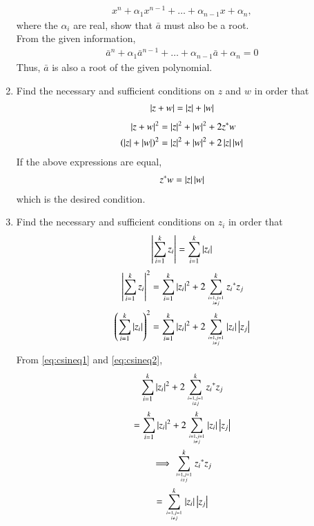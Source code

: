 \begin{enumerate}[label=\arabic*.,ref=\thesubsection.\theenumi]
		\begin{align}
			x^{n} +\alpha_1x^{n-1} + \dots + \alpha_{n-1}x + \alpha_n,
		\end{align}
		where the $\alpha_i$ are real, show that $\bar{a}$ must also be a root.
		\\
		\solution From the given information, 
		\begin{align}
			\bar{a}^{n} +\alpha_1\bar{a}^{n-1} + \dots + \alpha_{n-1}\bar{a} + \alpha_n = 0
		\end{align}
		Thus, $\bar{a}$ is also a root of the given polynomial.
	\item Find the necessary and sufficient conditions on $z$ and $w$ in order that
		\begin{align}
			\left\vert z+w\right\vert = \left\vert z\right\vert + \left\vert w\right\vert
		\end{align}
		\solution 
		\begin{align}
			\left\vert z+w\right\vert^2 
			&= \left\vert z\right\vert^2 + \left\vert w\right\vert^2 +2z^{*}w
			\\
			\left(\left\vert z\right\vert + \left\vert w\right\vert\right)^2 &= \left\vert z\right\vert^2 + \left\vert w\right\vert^2 +2\left\vert z\right\vert\left\vert w\right\vert
		\end{align}
		If the above expressions are equal, 
		\begin{align}
z^{*}w = \left\vert z\right\vert\left\vert w\right\vert
		\end{align}
		which is the desired condition.
	\item Find the necessary and sufficient conditions on $z_i$  in order that
		\begin{align}
			\left\vert\sum_{i=1}^{k}z_i\right\vert = \sum_{i=1}^{k}\left\vert z_i\right\vert
		\end{align}
		\solution 
		\begin{align}
			\label{eq:csineq1}
			\left\vert\sum_{i=1}^{k}z_i\right\vert^2 &= \sum_{i=1}^{k}\left\vert z_i\right\vert^2 + 2\sum_{i=1,j=1 \atop i \ne j }^{k}{z_i}^* z_j
			\\
			\left(\sum_{i=1}^{k}\left\vert z_i\right\vert\right)^2 &= \sum_{i=1}^{k}\left\vert z_i\right\vert^2 + 2\sum_{i=1,j=1 \atop i \ne j }^{k}\left\vert{z_i}\right\vert\left\vert z_j\right\vert
			\label{eq:csineq2}
		\end{align}
			From \eqref{eq:csineq1} and 
			\eqref{eq:csineq2},
\begin{multline}
			\sum_{i=1}^{k}\left\vert z_i\right\vert^2 + 2\sum_{i=1,j=1 \atop i \ne j }^{k}{z_i}^* z_j
			\\
			=
\sum_{i=1}^{k}\left\vert z_i\right\vert^2 + 2\sum_{i=1,j=1 \atop i \ne j }^{k}\left\vert{z_i}\right\vert\left\vert z_j\right\vert
\\
\implies 
\sum_{i=1,j=1 \atop i \ne j }^{k}{z_i}^* z_j
\\
= \sum_{i=1,j=1 \atop i \ne j }^{k}\left\vert{z_i}\right\vert\left\vert z_j\right\vert
\end{multline}

\end{enumerate}
